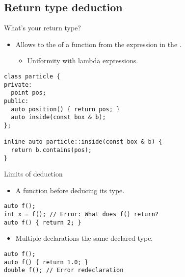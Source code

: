 \subsection{Return type deduction}

\begin{frame}[t,fragile]{What's your return type?}
\begin{itemize}
  \item Allows to  the
         of a function from the
        expression in the  .
    \begin{itemize}
      \item Uniformity with lambda expressions.
    \end{itemize}
\end{itemize}
\begin{lstlisting}
class particle {
private:
  point pos;
public:
  auto position() { return pos; }
  auto inside(const box & b);
};

inline auto particle::inside(const box & b) {
  return b.contains(pos);
}
\end{lstlisting}
\end{frame}

\begin{frame}[t,fragile]{Limits of deduction}
\begin{itemize}
  \item A function  before deducing its type.
\end{itemize}

\begin{lstlisting}
auto f();
int x = f(); // Error: What does f() return?
auto f() { return 2; }
\end{lstlisting}

\begin{itemize}
  \pause
  \item Multiple declarations  the same declared type.
\end{itemize}

\begin{lstlisting}
auto f();
auto f() { return 1.0; }
double f(); // Error redeclaration
\end{lstlisting}

\end{frame}

